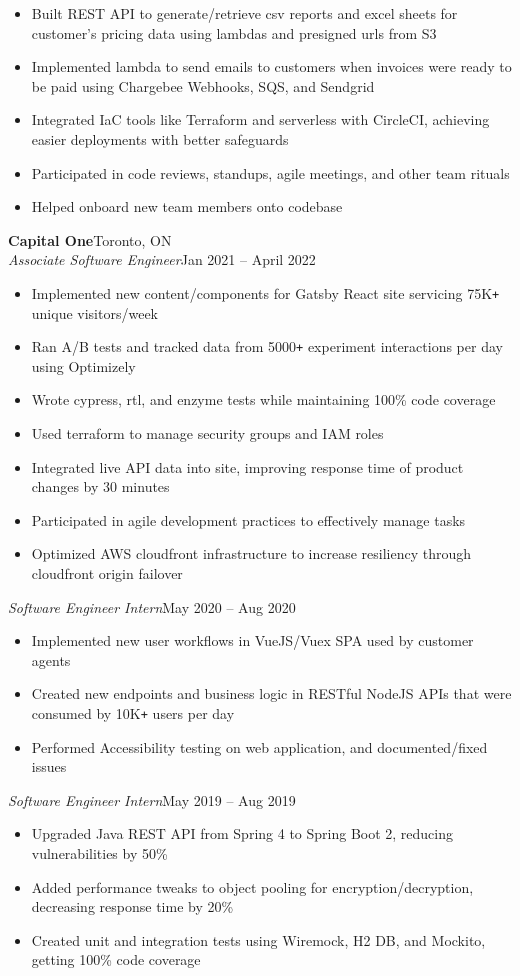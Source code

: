 \documentclass[letterpaper]{article}
\newcommand{\JobEntry}[3]{
	\normalsize\textbf{#1}\hfill\normalsize{#2}\\
	#3\vspace{0.1cm}
}
\newcommand{\DatedEntry}[3]{
	\small\textit{#1}\hfill\small{#2}\\
	\vspace{0.1cm}#3\vspace{0.1cm}
}
\begin{document}
{{\begin{itemize}[nolistsep]
			\item Built REST API to generate/retrieve csv reports and excel sheets for customer's pricing data using lambdas and presigned urls from S3
			\item Implemented lambda to send emails to customers when invoices were ready to be paid using Chargebee Webhooks, SQS, and Sendgrid
			\item Integrated IaC tools like Terraform and serverless with CircleCI, achieving easier deployments with better safeguards
			\item Participated in code reviews, standups, agile meetings, and other team rituals
			\item Helped onboard new team members onto codebase
		\end{itemize}
	}
}
\JobEntry{Capital One}{Toronto, ON}
{
	\DatedEntry{Associate Software Engineer}
		{Jan 2021 -- April 2022}
		{
			\begin{itemize}[nolistsep]
				\item Implemented new content/components for Gatsby React site servicing 75K\texttt{+} unique visitors/week
				\item Ran A/B tests and tracked data from 5000\texttt{+} experiment interactions per day using Optimizely
				\item Wrote cypress, rtl, and enzyme tests while maintaining 100\% code coverage
				\item Used terraform to manage security groups and IAM roles
				\item Integrated live API data into site, improving response time of product changes by 30 minutes
				\item Participated in agile development practices to effectively manage tasks 
				\item Optimized AWS cloudfront infrastructure to increase resiliency through cloudfront origin failover
			\end{itemize}
	}
	\DatedEntry{Software Engineer Intern}
		{May 2020 -- Aug 2020}
		{
			\begin{itemize}[nolistsep]
				\item Implemented new user workflows in VueJS/Vuex SPA used by customer agents
				\item Created new endpoints and business logic in RESTful NodeJS APIs that were consumed by 10K\texttt{+} users per day
				\item Performed Accessibility testing on web application, and documented/fixed issues
			\end{itemize}
		}
	\DatedEntry{Software Engineer Intern}
		{May 2019 -- Aug 2019}
		{
			\begin{itemize}[nolistsep]
				\item Upgraded Java REST API from Spring 4 to Spring Boot 2, reducing vulnerabilities by 50\%
				\item Added performance tweaks to object pooling for encryption/decryption, decreasing response time by 20\%
				\item Created unit and integration tests using Wiremock, H2 DB, and Mockito, getting 100\% code coverage
			\end{itemize}
		}
}
\vspace{-0.3cm}
\end{document}
